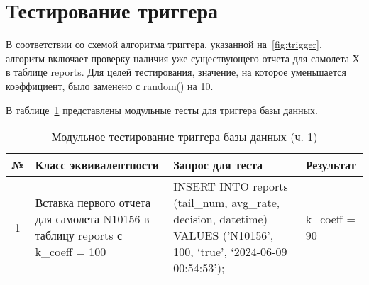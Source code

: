 
\section{Тестирование триггера}
В соответствии со схемой алгоритма триггера, указанной на~\ref{fig:trigger}, алгоритм включает проверку наличия уже существующего отчета для самолета Х в таблице reports.
Для целей тестирования, значение, на которое уменьшается коэффициент, было заменено с random() на 10.

В таблице~\ref{tab:tabl10} представлены модульные тесты для триггера базы данных.
\begin{table}[H]
    \centering
    \captionsetup{justification=raggedright}
    \caption{Модульное тестирование триггера базы данных (ч. 1)}
    \begin{tabular}{|c|p{}|p{}|p{}|}
        \hline
        № & Класс \newline эквивалентности & Запрос для теста & Результат \\
        \hline
        1 & Вставка первого \newline отчета для самолета N10156 в таблицу reports с k\_coeff = 100 & INSERT INTO reports (tail\_num, avg\_rate, decision, datetime) VALUES ('N10156', 100, `true', `2024-06-09 00:54:53'); & k\_coeff = 90 \\
        \hline
    \end{tabular}
    \label{tab:tabl10}
\end{table}


